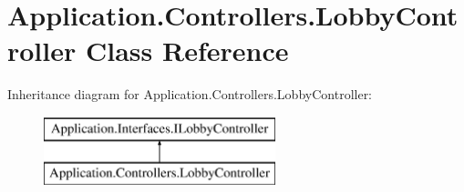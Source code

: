 \hypertarget{class_application_1_1_controllers_1_1_lobby_controller}{}\section{Application.\+Controllers.\+Lobby\+Controller Class Reference}
\label{class_application_1_1_controllers_1_1_lobby_controller}
Inheritance diagram for Application.\+Controllers.\+Lobby\+Controller\+:\begin{figure}[H]
\begin{center}
\leavevmode
\includegraphics[height=2.000000cm]{class_application_1_1_controllers_1_1_lobby_controller}
\end{center}
\end{figure}
